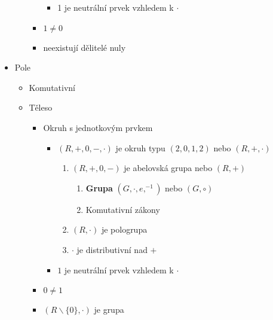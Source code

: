 \documentclass[a4paper, 11pt]{report}
\begin{document}
\begin{itemize}
\begin{itemize}
\begin{itemize}
\begin{itemize}
   \item 1 je neutrální prvek vzhledem k $\cdot$
   \end{itemize}
  \item $1 \not= 0$
  \item neexistují dělitelé nuly
  \end{itemize}
 \end{itemize}
\item Pole
 \begin{itemize}
 \item Komutativní
 \item Těleso
  \begin{itemize}
  \item Okruh s jednotkovým prvkem
   \begin{itemize}
   \item $(R, +, 0, -, \cdot)$ je okruh typu $(2, 0, 1, 2)$ nebo $(R, +, \cdot)$
    \begin{enumerate}
    \item $(R, +, 0, -)$ je abelovská grupa nebo $(R, +)$
     \begin{enumerate}
     \item \textbf{Grupa} $(G, \cdot, e, ^{-1})$ nebo $(G, \circ)$
     \item Komutativní zákony
     \end{enumerate}
    \item $(R, \cdot)$ je pologrupa
    \item $\cdot$ je distributivní nad $+$
    \end{enumerate}
   \item $1$ je neutrální prvek vzhledem k $\cdot$
   \end{itemize}
  \item $0 \not= 1$
  \item $(R \backslash \{0\}, \cdot)$ je grupa
  \end{itemize}
 \end{itemize}


\end{itemize}
\end{document}
